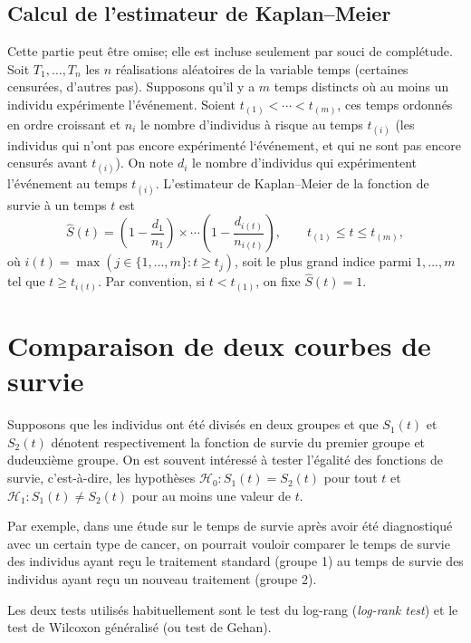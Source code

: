 \documentclass[
  11pt,
  letterpaper,
]{book}
\theoremstyle{definition}
\theoremstyle{definition}
\theoremstyle{definition}
\theoremstyle{remark}
\begin{document}
\hypertarget{calcul-de-lestimateur-de-kaplanmeier}{%
\subsection{Calcul de l'estimateur de Kaplan--Meier}\label{calcul-de-lestimateur-de-kaplanmeier}}

Cette partie peut être omise; elle est incluse seulement par souci de complétude. Soit \(T_1, \ldots, T_n\) les \(n\) réalisations aléatoires de la variable temps (certaines censurées, d'autres pas). Supposons qu'il y a \(m\) temps distincts où au moins un individu expérimente l'événement. Soient \(t_{(1)} < \cdots < t_{(m)}\), ces temps ordonnés en ordre croissant et \(n_i\) le nombre d'individus à risque au temps \(t_{(i)}\) (les individus qui n'ont pas encore expérimenté l`événement, et qui ne sont pas encore censurés avant \(t_{(i)}\)). On note \(d_i\) le nombre d'individus qui expérimentent l'événement au temps \(t_{(i)}\). L'estimateur de Kaplan--Meier de la fonction de survie à un temps \(t\) est
\[ \widehat{S}(t) = \left( 1- \frac{d_1}{n_1}\right) \times \cdots \left( 1- \frac{d_{i(t)}}{n_{i(t)}}\right), \qquad t_{(1)} \leq t \leq t_{(m)},
\]
où \(i(t) =\max(j \in \{1, \ldots, m\}: t \geq t_{j})\), soit le plus grand indice parmi \(1, \ldots, m\) tel que \(t \geq t_{i(t)}\). Par convention, si \(t < t_{(1)}\), on fixe \(\widehat{S}(t)=1\).

\hypertarget{comparaison-de-deux-courbes-de-survie}{%
\section{Comparaison de deux courbes de survie}\label{comparaison-de-deux-courbes-de-survie}}

Supposons que les individus ont été divisés en deux groupes et que \(S_1(t)\) et \(S_2(t)\) dénotent respectivement la fonction de survie du premier groupe et dudeuxième groupe. On est souvent intéressé à tester l'égalité des fonctions de survie, c'est-à-dire, les hypothèses \(\mathcal{H}_0: S_1(t) = S_2(t)\) pour tout \(t\) et \(\mathcal{H}_1: S_1(t) \neq S_2(t)\) pour au moins une valeur de \(t\).

Par exemple, dans une étude sur le temps de survie après avoir été diagnostiqué avec un certain type de cancer, on pourrait vouloir comparer le temps de survie des individus ayant reçu le traitement standard (groupe 1) au temps de survie des individus ayant reçu un nouveau traitement (groupe 2).

Les deux tests utilisés habituellement sont le test du log-rang (\emph{log-rank test}) et le test de Wilcoxon généralisé (ou test de Gehan).
\end{document}
